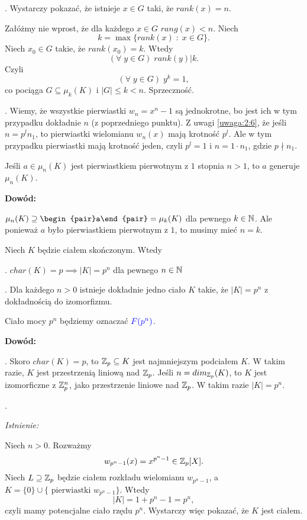 . Wystarczy pokazać, że istnieje $x\in G$ taki, że $rank(x)=n$.

Załóżmy nie wprost, że dla każdego $x\in G$ $rang(x)<n$. Niech 
$$k=\max\{rank(x)\;:\;x\in G\}.$$ 
Niech $x_0\in G$ takie, że $rank(x_0)=k$. Wtedy 
$$(\forall\;y\in G)\;rank(y)|k.$$ 
Czyli
$$(\forall\;y\in G)\;y^k=1,$$
co pociąga $G\subseteq \mu_k(K)$ i $|G|\leq k<n$. Sprzeczność.

. Wiemy, że wszystkie pierwiastki $w_n=x^n-1$ są jednokrotne, bo jest ich w tym przypadku dokładnie $n$ (z poprzedniego punktu). Z uwagi \ref{uwaga:2:6}, że jeśli $n=p^ln_1$, to pierwiastki wielomianu $w_n(x)$ mają krotność $p^l$. Ale w tym przypadku pierwiastki mają krotność jeden, czyli $p^l=1$ i $n=1\cdot n_1$, gdzie $p\nmid n_1$.

\begin{wniosek}
    Jeśli $a\in \mu_n(K)$ jest pierwiastkiem pierwotnym z $1$ stopnia $n>1$, to $a$ generuje $\mu_n(K)$.
\end{wniosek}

\textbf{Dowód:}

$\mu_n(K)\supseteq\begin{pair}a\end{pair}=\mu_k(K)$ dla pewnego $k\in\mathbb{N}$. Ale ponieważ $a$ było pierwiastkiem pierwotnym z $1$, to musimy mieć $n=k$.

\begin{tw}
    Niech $K$ będzie ciałem skończonym. Wtedy

. $char(K)=p\implies |K|=p^n$ dla pewnego $n\in\mathbb{N}$

. Dla każdego $n>0$ istnieje dokładnie jedno ciało $K$ takie, że $|K|=p^n$ z dokładnością do izomorfizmu.

Ciało mocy $p^n$ będziemy oznaczać $\color{blue}F(p^n)$.
\end{tw}

\textbf{Dowód:}

. Skoro $char(K)=p$, to $\mathbb{Z}_p\subseteq K$ jest najmniejszym podciałem $K$. W takim razie, $K$ jest przestrzenią liniową nad $\mathbb{Z}_p$. Jeśli $n=dim_{\mathbb{Z}_p}(K)$, to $K$ jest izomorficzne z $\mathbb{Z}_p^n$, jako przestrzenie liniowe nad $\mathbb{Z}_p$. W takim razie $|K|=p^n$.

. 

\emph{Istnienie:}

Niech $n>0$. Rozważmy 
$$w_{p^{n}-1}(x)=x^{p^n-1}\in\mathbb{Z}_p[X].$$
Niech $L\supseteq\mathbb{Z}_p$ będzie ciałem rozkładu wielomianu $w_{p^n-1}$, a $K=\{0\}\cup\{\text{ pierwiastki }w_{p^n-1}\}$. Wtedy
$$|K|=1+p^n-1=p^n,$$
czyli mamy potencjalne ciało rzędu $p^n$. Wystarczy więc pokazać, że $K$ jest ciałem.

